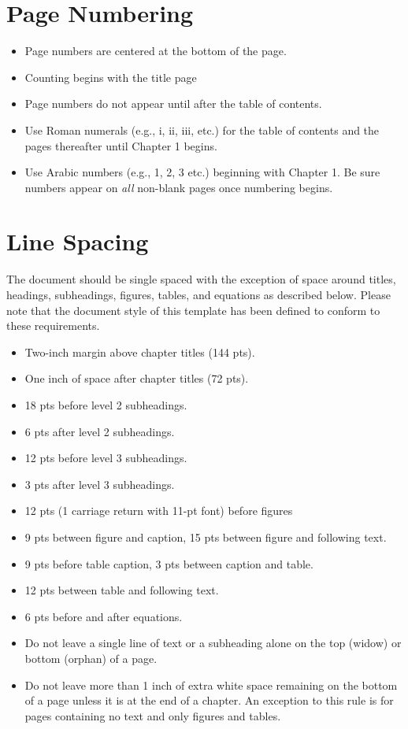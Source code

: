 	\section{Page Numbering}
	\begin{itemize}
		\item Page numbers are centered at the bottom of the page.
		\item Counting begins with the title page
		\item Page numbers do not appear until after the table of contents.
		\item Use Roman numerals (e.g., i, ii, iii, etc.) for the table of contents and the pages thereafter until Chapter 1 begins.
		\item Use Arabic numbers (e.g., 1, 2, 3 etc.) beginning with Chapter 1. Be sure numbers appear on {\em all} non-blank pages once numbering begins.
	\end{itemize}

	\section{Line Spacing}
	The document should be single spaced with the exception of space around titles, headings, subheadings, figures, tables, and equations as described below. Please note that the document style of this template  has been defined to conform to these requirements.
	\begin{itemize}
		\item Two-inch margin above chapter titles (144 pts).
		\item One inch of space after chapter titles (72 pts).
		\item 18 pts before level 2 subheadings.
		\item 6 pts after level 2 subheadings.
		\item 12 pts before level 3 subheadings.
		\item 3 pts after level 3 subheadings.
		\item 12 pts (1 carriage return with 11-pt font) before figures
		\item 9 pts between figure and caption, 15 pts between figure and following text.
		\item 9 pts before table caption, 3 pts between caption and table.
		\item 12 pts between table and following text.
		\item 6 pts before and after equations.
		\item Do not leave a single line of text or a subheading alone on the top (widow) or bottom (orphan) of a page.
		\item Do not leave more than 1 inch of extra white space remaining on the bottom of a page unless it is at the end of a chapter. An exception to this rule is for pages containing no text and only figures and tables.
	\end{itemize}
	
